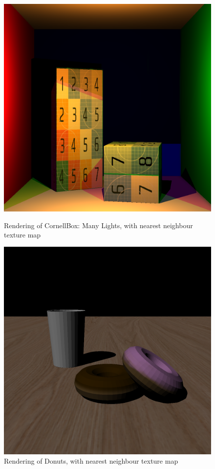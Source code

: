 \documentclass[a4paper]{myarticle}
\begin{document}
\begin{figure}[H]
    \begin{minipage}[t]{.4\textwidth}
        \centering
        \includegraphics[width=\textwidth]{q2/CornellBox/many_lights.png}
        \caption{Rendering of CornellBox: Many Lights, with nearest neighbour texture map}
    \end{minipage}
    \hfill
    \begin{minipage}[t]{.4\textwidth}
        \centering
        \includegraphics[width=\textwidth]{q2/Donuts/scene.png}
        \caption{Rendering of Donuts, with nearest neighbour texture map}
    \end{minipage}
\end{figure}
\end{document}

